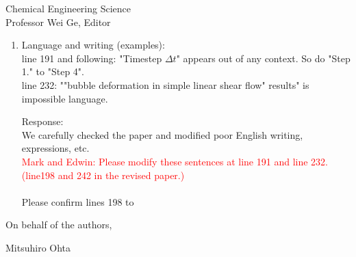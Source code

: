 \documentclass{letter}
\begin{document}
\begin{letter}{
Chemical Engineering Science\\
Professor Wei Ge, Editor\\}
\begin{enumerate}
Response: \\
In our computations, we set $g = 0$ because we wanted to clearly isolate only the effects of the density and viscosity ratios and 
wanted to compare previous studies dealing with the deformation and breakup of a drop with $\lambda =1$ and $\eta = 1$.
When the gravity is considered, we obtain $Fr$ (Froude number) $\left(= \frac{{\it \Gamma}R}{\sqrt {gR}} \right)$ = 1.7 ($Re$ = 93 and $Ca$ = 0.3) 
and 1.9 ($Re = 43$ and $Ca$ = 0.8). \\
Although the values of $Fr$ are not so large, the effect of gravity (bubble rise motion) may not be completely negligible in terms of $Fr$.
However, bubbles for both conditions reach the breakup at $t$ = about 0.5 s. 
($V$ (moving wall speed) had about 1.1 $\sim$ 1.3 m/s for the range of $Ca$ and $Re$ in our computaions.)
Therefore, the effect of gravity (bubble rise motion) is expected to be negligible to the behavior of bubble deformation and breakup 
around critical $Re$ number conditions. Our computational results will provide fundamental knowledge and findings for practical applications.
In the revised paper, we have described these explanations.\\
\\
Please see lines 123 to 130.
\\

\par\noindent
\item
\textsf
{Language and writing (examples):\\
line 191 and following: "Timestep $\Delta t$" appears out of any context. So do "Step 1." to "Step 4".\\
line 232: ""bubble deformation in simple linear shear flow" results" is impossible language. \\}
\vspace{3 mm}

Response: \\
We carefully checked the paper and modified poor English writing, expressions, etc.\\
\textcolor{red}
{
Mark and Edwin: Please modify these sentences at line 191 and line 232. (line198 and 242 in the revised paper.)\\
}
\\
Please confirm lines  198 to 
\\


\end{enumerate}

\closing{On behalf of the authors,}
Mitsuhiro Ohta

\end{letter}
\end{document}
